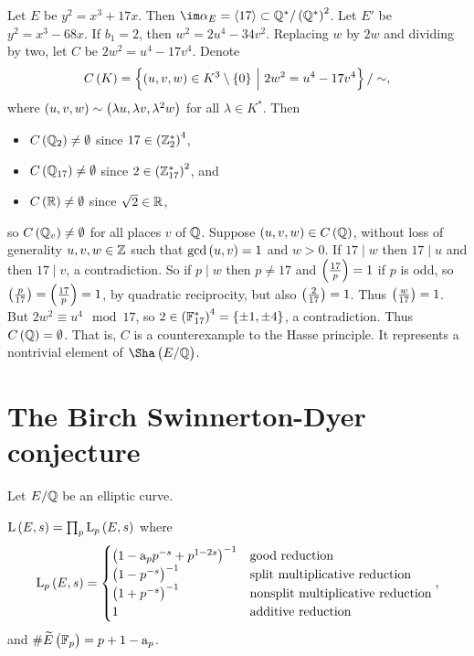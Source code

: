 \begin{example*}[Lind]
Let $ E $ be $ y^2 = x^3 + 17x $. Then $ \im \alpha_E = \abr{17} \subset \QQ^* / \br{\QQ^*}^2 $. Let $ E' $ be $ y^2 = x^3 - 68x $. If $ b_1 = 2 $, then $ w^2 = 2u^4 - 34v^2 $. Replacing $ w $ by $ 2w $ and dividing by two, let $ C $ be $ 2w^2 = u^4 - 17v^4 $. Denote
$$ C\br{K} = \cbr{\br{u, v, w} \in K^3 \setminus \cbr{0} \st 2w^2 = u^4 - 17v^4} / \sim, $$
where $ \br{u, v, w} \sim \br{\lambda u, \lambda v, \lambda^2 w} $ for all $ \lambda \in K^* $. Then
\begin{itemize}
\item $ C\br{\QQ_2} \ne \emptyset $ since $ 17 \in \br{\ZZ_2^*}^4 $,
\item $ C\br{\QQ_{17}} \ne \emptyset $ since $ 2 \in \br{\ZZ_{17}^*}^2 $, and
\item $ C\br{\RR} \ne \emptyset $ since $ \sqrt{2} \in \mathbb{R} $,
\end{itemize}
so $ C\br{\QQ_v} \ne \emptyset $ for all places $ v $ of $ \mathbb{Q} $. Suppose $ \br{u, v, w} \in C\br{\QQ} $, without loss of generality $ u, v, w \in \mathbb{Z} $ such that $ \gcd\br{u, v} = 1 $ and $ w > 0 $. If $ 17 \mid w $ then $ 17 \mid u $ and then $ 17 \mid v $, a contradiction. So if $ p \mid w $ then $ p \ne 17 $ and $ \br{\tfrac{17}{p}} = 1 $ if $ p $ is odd, so $ \br{\tfrac{p}{17}} = \br{\tfrac{17}{p}} = 1 $, by quadratic reciprocity, but also $ \br{\tfrac{2}{17}} = 1 $. Thus $ \br{\tfrac{w}{17}} = 1 $. But $ 2w^2 \equiv u^4 \mod 17 $, so $ 2 \in \br{\FF_{17}^*}^4 = \cbr{\pm 1, \pm 4} $, a contradiction. Thus $ C\br{\QQ} = \emptyset $. That is, $ C $ is a counterexample to the Hasse principle. It represents a nontrivial element of $ \Sha\br{E / \QQ} $.
\end{example*}

\pagebreak

\appendix

\section{The Birch Swinnerton-Dyer conjecture}

Let $ E / \mathbb{Q} $ be an elliptic curve.

\begin{definition*}
$ \L\br{E, s} = \prod_p \L_p\br{E, s} $ where
$$ \L_p\br{E, s} =
\begin{cases}
\br{1 - \a_pp^{-s} + p^{1 - 2s}}^{-1} & \text{good reduction} \\
\br{1 - p^{-s}}^{-1} & \text{split multiplicative reduction} \\
\br{1 + p^{-s}}^{-1} & \text{nonsplit multiplicative reduction} \\
1 & \text{additive reduction}
\end{cases},
$$
and $ \#\widetilde{E}\br{\FF_p} = p + 1 - \a_p $.
\end{definition*}

